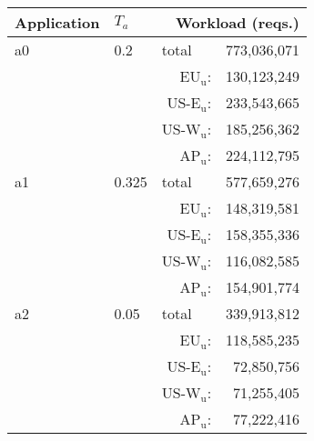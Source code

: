 \begin{tabular}{llrr}
\toprule
Application & $T_a$ & \multicolumn{2}{r}{Workload (reqs.)} \\

\midrule
a0 & 0.2 & \multicolumn{1}{l}{total \dotfill} & 773,036,071 \\
 &  &   \hspace{0.4cm}$\text{EU}_\text{u}$: & 130,123,249 \\
 &  &   \hspace{0.4cm}$\text{US-E}_\text{u}$: & 233,543,665 \\
 &  &   \hspace{0.4cm}$\text{US-W}_\text{u}$: & 185,256,362 \\
 &  &   \hspace{0.4cm}$\text{AP}_\text{u}$: & 224,112,795 \\
a1 & 0.325 & \multicolumn{1}{l}{total \dotfill} & 577,659,276 \\
 &  &   \hspace{0.4cm}$\text{EU}_\text{u}$: & 148,319,581 \\
 &  &   \hspace{0.4cm}$\text{US-E}_\text{u}$: & 158,355,336 \\
 &  &   \hspace{0.4cm}$\text{US-W}_\text{u}$: & 116,082,585 \\
 &  &   \hspace{0.4cm}$\text{AP}_\text{u}$: & 154,901,774 \\
a2 & 0.05 & \multicolumn{1}{l}{total \dotfill} & 339,913,812 \\
 &  &   \hspace{0.4cm}$\text{EU}_\text{u}$: & 118,585,235 \\
 &  &   \hspace{0.4cm}$\text{US-E}_\text{u}$: & 72,850,756 \\
 &  &   \hspace{0.4cm}$\text{US-W}_\text{u}$: & 71,255,405 \\
 &  &   \hspace{0.4cm}$\text{AP}_\text{u}$: & 77,222,416 \\
\bottomrule
\end{tabular}

